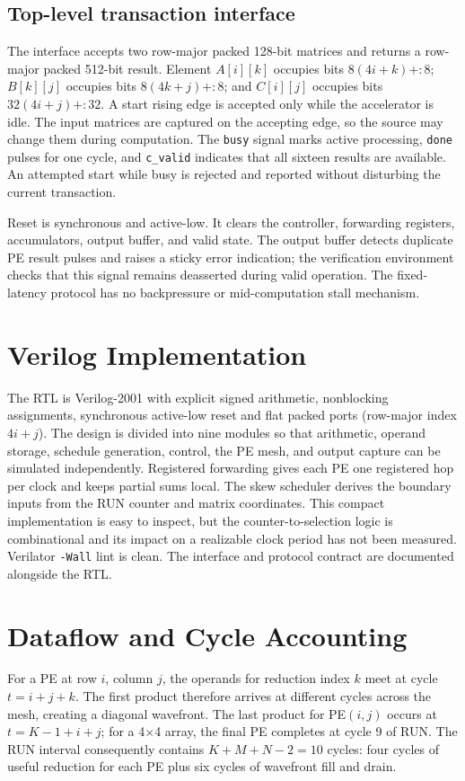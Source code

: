 \documentclass[conference]{IEEEtran}
\begin{document}
\subsection{Top-level transaction interface}
The interface accepts two row-major packed 128-bit matrices and returns a row-major packed 512-bit result. Element
$A[i][k]$ occupies bits $8(4i+k)+:8$; $B[k][j]$ occupies bits $8(4k+j)+:8$; and $C[i][j]$ occupies bits
$32(4i+j)+:32$. A start rising edge is accepted only while the accelerator is idle. The input matrices are captured
on the accepting edge, so the source may change them during computation. The \texttt{busy} signal marks active
processing, \texttt{done} pulses for one cycle, and \texttt{c\_valid} indicates that all sixteen results are available.
An attempted start while busy is rejected and reported without disturbing the current transaction.

Reset is synchronous and active-low. It clears the controller, forwarding registers, accumulators, output buffer, and
valid state. The output buffer detects duplicate PE result pulses and raises a sticky error indication; the verification
environment checks that this signal remains deasserted during valid operation. The fixed-latency protocol has no
backpressure or mid-computation stall mechanism.

\section{Verilog Implementation}
The RTL is Verilog-2001 with explicit signed arithmetic, nonblocking assignments, synchronous active-low reset and flat packed ports
(row-major index $4i+j$). The design is divided into nine modules so that arithmetic, operand storage, schedule generation,
control, the PE mesh, and output capture can be simulated independently. Registered forwarding gives each PE one
registered hop per clock and keeps partial sums local. The skew scheduler derives the boundary inputs from the RUN
counter and matrix coordinates. This compact implementation is easy to inspect, but the counter-to-selection logic is
combinational and its impact on a realizable clock period has not been measured. Verilator \texttt{-Wall} lint is clean.
The interface and protocol contract are documented alongside the RTL.

\section{Dataflow and Cycle Accounting}
For a PE at row $i$, column $j$, the operands for reduction index $k$ meet at cycle $t=i+j+k$. The first product
therefore arrives at different cycles across the mesh, creating a diagonal wavefront. The last product for PE$(i,j)$
occurs at $t=K-1+i+j$; for a 4$\times$4 array, the final PE completes at cycle 9 of RUN. The RUN interval consequently
contains $K+M+N-2=10$ cycles: four cycles of useful reduction for each PE plus six cycles of wavefront fill and drain.
\end{document}
